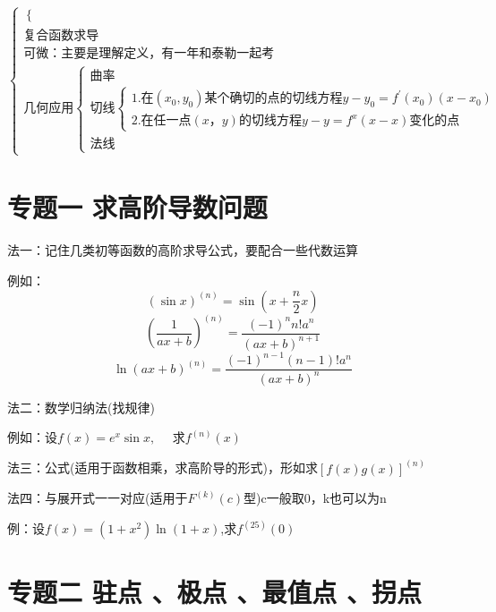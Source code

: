 \documentclass[a4paper,11pt]{book}
\begin{document}
\[\begin{cases}
\begin{cases}
        \end{cases}\\
    \text{复合函数求导}\\
    \text{可微：主要是理解定义，有一年和泰勒一起考}\\
    \text{几何应用}
        \begin{cases}
            \text{曲率}\\
            \text{切线}
                \begin{cases}
                    1.\text{在}(x_{0},y_{0})\text{某个确切的点的切线方程}y-y_{0}=f^{\prime}(x_{0})(x-x_{0})\\
                    2.\text{在任一点}(x，y)\text{的切线方程}y-y=f^{x}(x-x)\text{变化的点}
                \end{cases}\\
            \text{法线}
        \end{cases}
\end{cases}
\]

\section*{专题一 \quad 求高阶导数问题}

法一：记住几类初等函数的高阶求导公式，要配合一些代数运算

例如：\[(\sin x)^{(n)}=\sin \left(x+\frac{n}{2} x\right)\]
$$\left(\frac{1}{a x+b}\right)^{(n)}=\frac{(-1)^{n} n!a^{n}}{(a x+b)^{n+1}}$$
$$\ln (a x+b)^{(n)}=\frac{(-1)^{n-1}(n-1) ! a^{n}}{(a x+b)^{n}}$$

\vspace{3ex}

\noindent 法二：数学归纳法(找规律)

例如：设$f(x)=e^{x} \sin x, \quad \text { 求} f^{(n)}(x)$

\vspace{3ex}

\noindent 法三：公式(适用于函数相乘，求高阶导的形式)，形如求$[f(x) g(x)]^{(n)}$

\vspace{3ex}

\noindent 法四：与展开式一一对应(适用于$F^{(k)}(c)$型)c一般取0，k也可以为n

例：设$f(x)=\left(1+x^{2}\right) \ln (1+x)$,求$f^{(25)}(0)$

\section*{专题二 \quad 驻点 、极点 、最值点 、拐点}
\end{document}
